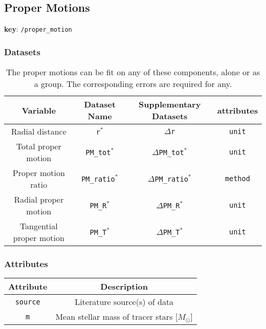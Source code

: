 \subsection{Proper Motions}

\textbf{key}: \texttt{/proper\_motion}

\subsubsection{Datasets}

\begin{center}
\begin{table}[H]
\begin{tabular}{ | c | c | c | c | }
    \hline
    Variable & Dataset Name & Supplementary Datasets &  attributes \\
    \hline\hline
    Radial distance & \texttt{r\(^*\)} & \texttt{\(\Delta\)r} & \texttt{unit} \\
    \hline
    Total proper motion & \texttt{PM\_tot\(^*\)} &
    \texttt{\(\Delta\)PM\_tot\(^*\)} & \texttt{unit}\\
    \hline
    Proper motion ratio & \texttt{PM\_ratio\(^*\)} &
    \texttt{\(\Delta\)PM\_ratio\(^*\)} & \texttt{method} \\
    \hline
    Radial proper motion & \texttt{PM\_R\(^*\)} &
    \texttt{\(\Delta\)PM\_R\(^*\)} & \texttt{unit}\\
    \hline
    Tangential proper motion & \texttt{PM\_T\(^*\)} &
    \texttt{\(\Delta\)PM\_T\(^*\)} & \texttt{unit}\\
    \hline
\end{tabular}
\caption*{
    The proper motions can be fit on any of these components, alone or as a
    group. The corresponding errors are required for any.
}
\end{table}
\end{center}

\subsubsection{Attributes}


\begin{center}
\begin{table}[H]
\begin{tabular}{ | c | c | }
    \hline
    Attribute & Description \\
    \hline\hline
    \texttt{source} & Literature source(s) of data \\
    \hline
    \texttt{m} & Mean stellar mass of tracer stars [\(M_\odot\)] \\
    \hline
\end{tabular}
\end{table}
\end{center}
